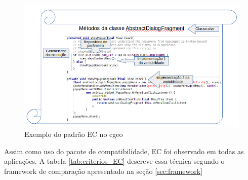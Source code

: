 \begin{figure}[ht]
\centering
\includegraphics[width=1\textwidth]{imagens/EC_in_cgeo2.png}
\caption{Exemplo do padrão EC no cgeo}
\label{fig:exemploEC}
\end{figure}

Assim como uso do pacote de compatibilidade, EC foi observado em todas as aplicações.
A tabela \ref{tab:criterios_EC} descreve essa técnica
segundo o framework de comparação apresentado na seção \ref{sec:framework}

